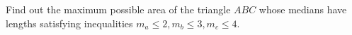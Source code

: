 Find out the maximum possible area of the triangle $ABC$ whose medians have lengths satisfying inequalities $m_a \le 2, m_b \le 3, m_c \le  4$.